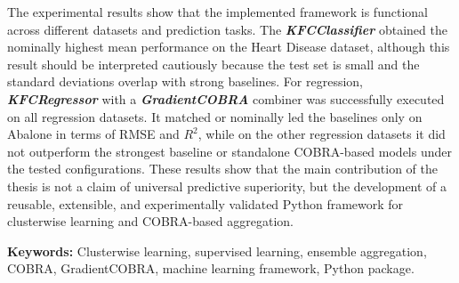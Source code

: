 The experimental results show that the implemented framework is functional across different datasets and prediction tasks. The \textbf{\textit{KFCClassifier}} obtained the nominally highest mean performance on the Heart Disease dataset, although this result should be interpreted cautiously because the test set is small and the standard deviations overlap with strong baselines. For regression, \textbf{\textit{KFCRegressor}} with a \textbf{\textit{GradientCOBRA}} combiner was successfully executed on all regression datasets. It matched or nominally led the baselines only on Abalone in terms of RMSE and $R^2$, while on the other regression datasets it did not outperform the strongest baseline or standalone COBRA-based models under the tested configurations. These results show that the main contribution of the thesis is not a claim of universal predictive superiority, but the development of a reusable, extensible, and experimentally validated Python framework for clusterwise learning and COBRA-based aggregation.

\vspace{0.5cm}
\noindent\textbf{Keywords:} Clusterwise learning, supervised learning, ensemble aggregation, COBRA, GradientCOBRA, machine learning framework, Python package.
